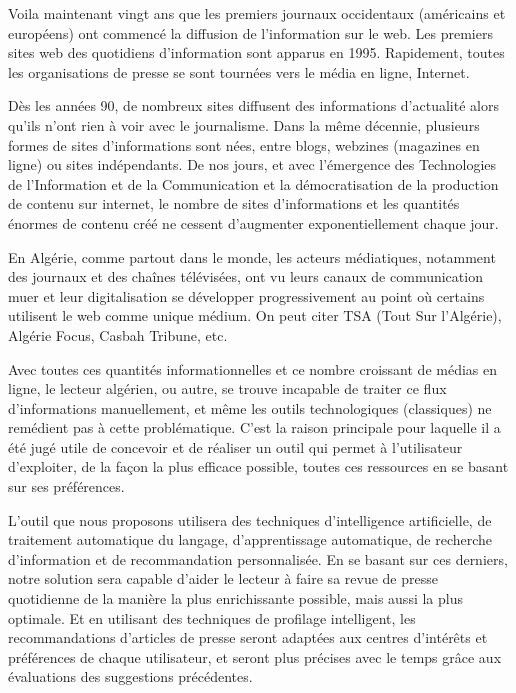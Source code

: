 
Voila maintenant vingt ans que les premiers journaux occidentaux (américains et européens) ont commencé la diffusion de l'information sur le web. Les premiers sites web des quotidiens d'information sont apparus en 1995. Rapidement, toutes les organisations de presse se sont tournées vers le média en ligne, Internet.

Dès les années 90, de nombreux sites diffusent des informations d'actualité alors qu'ils n'ont rien à voir avec le journalisme. Dans la même décennie, plusieurs formes de sites d'informations sont nées, entre blogs, webzines (magazines en ligne) ou sites indépendants. De nos jours, et avec l'émergence des Technologies de l'Information et de la Communication et la démocratisation de la production de contenu sur internet, le nombre de sites d'informations et les quantités énormes de contenu créé ne cessent d'augmenter exponentiellement chaque jour.

En Algérie, comme partout dans le monde, les acteurs médiatiques, notamment des journaux et des chaînes télévisées, ont vu leurs canaux de communication muer et leur digitalisation se développer progressivement au point où certains utilisent le web comme unique médium. On peut citer TSA (Tout Sur l'Algérie), Algérie Focus, Casbah Tribune, etc.

Avec toutes ces quantités informationnelles et ce nombre croissant de médias en ligne, le lecteur algérien, ou autre, se trouve incapable de traiter ce flux d'informations manuellement, et même les outils technologiques (classiques) ne remédient pas à cette problématique. C'est la raison principale pour laquelle il a été jugé utile de concevoir et de réaliser un outil qui permet à l'utilisateur d'exploiter, de la façon la plus efficace possible, toutes ces ressources en se basant sur ses préférences.

L'outil que nous proposons utilisera des techniques d'intelligence artificielle, de traitement automatique du langage, d'apprentissage automatique, de recherche d'information et de recommandation personnalisée. En se basant sur ces derniers, notre solution sera capable d'aider le lecteur à faire sa revue de presse quotidienne de la manière la plus enrichissante possible, mais aussi la plus optimale. Et en utilisant des techniques de profilage intelligent, les recommandations d'articles de presse seront adaptées aux centres d'intérêts et préférences de chaque utilisateur, et seront plus précises avec le temps grâce aux évaluations des suggestions précédentes.

